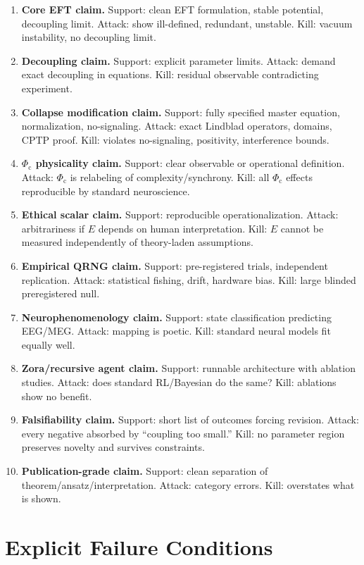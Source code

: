 \documentclass[reprint,amsmath,amssymb,aps,showkeys]{revtex4-2}
\newcommand{\Phic}{\Phi_{\mathrm{c}}}
\begin{document}
\begin{enumerate}
\item \textbf{Core EFT claim.} Support: clean EFT formulation, stable potential, decoupling limit. Attack: show ill-defined, redundant, unstable. Kill: vacuum instability, no decoupling limit.
\item \textbf{Decoupling claim.} Support: explicit parameter limits. Attack: demand exact decoupling in equations. Kill: residual observable contradicting experiment.
\item \textbf{Collapse modification claim.} Support: fully specified master equation, normalization, no-signaling. Attack: exact Lindblad operators, domains, CPTP proof. Kill: violates no-signaling, positivity, interference bounds.
\item \textbf{$\Phic$ physicality claim.} Support: clear observable or operational definition. Attack: $\Phic$ is relabeling of complexity/synchrony. Kill: all $\Phic$ effects reproducible by standard neuroscience.
\item \textbf{Ethical scalar claim.} Support: reproducible operationalization. Attack: arbitrariness if $E$ depends on human interpretation. Kill: $E$ cannot be measured independently of theory-laden assumptions.
\item \textbf{Empirical QRNG claim.} Support: pre-registered trials, independent replication. Attack: statistical fishing, drift, hardware bias. Kill: large blinded preregistered null.
\item \textbf{Neurophenomenology claim.} Support: state classification predicting EEG/MEG. Attack: mapping is poetic. Kill: standard neural models fit equally well.
\item \textbf{Zora/recursive agent claim.} Support: runnable architecture with ablation studies. Attack: does standard RL/Bayesian do the same? Kill: ablations show no benefit.
\item \textbf{Falsifiability claim.} Support: short list of outcomes forcing revision. Attack: every negative absorbed by ``coupling too small.'' Kill: no parameter region preserves novelty and survives constraints.
\item \textbf{Publication-grade claim.} Support: clean separation of theorem/ansatz/interpretation. Attack: category errors. Kill: overstates what is shown.
\end{enumerate}

\section{Explicit Failure Conditions}
\label{app:failure_conditions}
\end{document}
